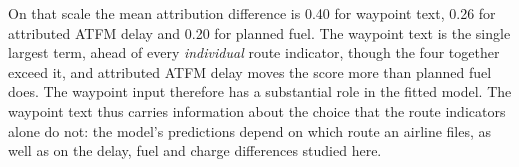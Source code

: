 \documentclass[a4paper,conference]{IEEEtran}
\begin{document}
On that scale the mean attribution difference is 0.40 for waypoint
text, 0.26 for attributed ATFM delay and 0.20 for planned fuel. The
waypoint text is the single largest term, ahead of every
\emph{individual} route indicator, though the four together exceed it,
and attributed ATFM delay moves the score more than planned fuel does.
The waypoint input therefore has a substantial role in the fitted model.
The waypoint text thus carries information about the choice that the route
indicators alone do not: the model's predictions depend on which route an
airline files, as well as on the delay, fuel and charge differences studied
here.

\end{document}
